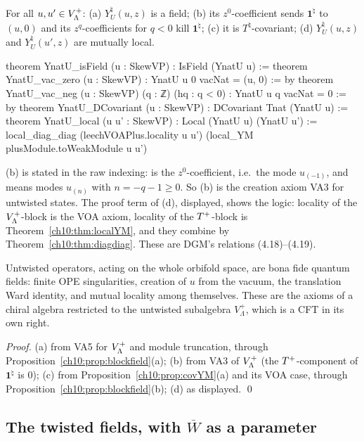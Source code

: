\begin{proposition}\label{ch10:prop:YnatU}
For all $u,u'\in V_{\Lambda}^{+}$:
(a) $Y^\natural_U(u,z)$ is a field;
(b) its $z^0$-coefficient sends $\mathbf1^\natural$ to $(u,0)$ and its $z^q$-coefficients for $q<0$
kill $\mathbf1^\natural$;
(c) it is $T^\natural$-covariant;
(d) $Y^\natural_U(u,z)$ and $Y^\natural_U(u',z)$ are mutually local.
\end{proposition}
\begin{leancode}
theorem YnatU_isField (u : SkewVP) : IsField (YnatU u) :=
theorem YnatU_vac_zero (u : SkewVP) : YnatU u 0 vacNat = (u, 0) := by
theorem YnatU_vac_neg (u : SkewVP) (q : ℤ) (hq : q < 0) : YnatU u q vacNat = 0 := by
theorem YnatU_DCovariant (u : SkewVP) : DCovariant Tnat (YnatU u) :=
theorem YnatU_local (u u' : SkewVP) : Local (YnatU u) (YnatU u') :=
  local_diag_diag (leechVOAPlus.locality u u') (local_YM plusModule.toWeakModule u u')
\end{leancode}
\begin{dictionary}
(b) is stated in the raw indexing:  is the $z^0$-coefficient, i.e.\ the mode
$u_{(-1)}$, and  means modes $u_{(n)}$ with $n=-q-1\ge0$.  So (b) is the creation
axiom VA3 for untwisted states.  The proof term of (d), displayed, shows the logic: locality of
the $V_{\Lambda}^{+}$-block is the VOA axiom, locality of the $T^{+}$-block is
Theorem~\ref{ch10:thm:localYM}, and they combine by Theorem~\ref{ch10:thm:diagdiag}.  These are
DGM's relations (4.18)--(4.19).
\end{dictionary}

\begin{physics}
Untwisted operators, acting on the whole orbifold space, are bona fide quantum fields: finite OPE singularities, creation of $u$ from the vacuum, the translation Ward identity, and mutual locality among themselves. These are the axioms of a chiral algebra restricted to the untwisted subalgebra $V_\Lambda^+$, which is a CFT in its own right.
\end{physics}

\emph{Proof.} (a) from VA5 for $V_{\Lambda}^{+}$ and module truncation, through
Proposition~\ref{ch10:prop:blockfield}(a); (b) from VA3 of $V_{\Lambda}^{+}$ (the $T^{+}$-component of
$\mathbf1^\natural$ is $0$); (c) from Proposition~\ref{ch10:prop:covYM}(a) and its VOA case,
through Proposition~\ref{ch10:prop:blockfield}(b); (d) as displayed. \qed

\subsection{The twisted fields, with \texorpdfstring{$\overline W$}{W-bar} as a parameter}

